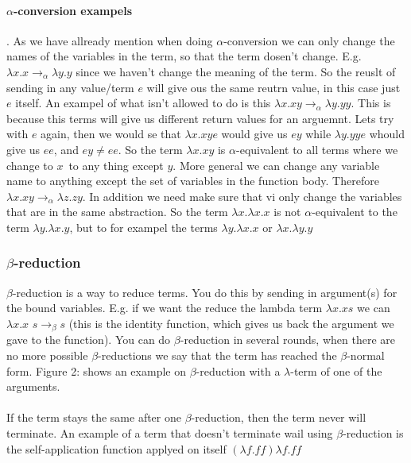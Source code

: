 \paragraph{$\alpha$-conversion exampels}. As we have allready mention when doing $\alpha$-conversion we can only change the names of the variables in the term, so that 
the term dosen't change. E.g. $\lambda x.x \rightarrow_\alpha \lambda y.y$ since we haven't change the meaning of the term. So the reuslt of sending in any value/term 
$e$ will give ous the same reutrn value, in this case just $e$ itself. An exampel of what isn't allowed to do is this $\lambda x.xy \rightarrow_\alpha \lambda y.yy$. This is 
because this terms will give us different return values for an arguemnt. Lets try with $e$ again, then we would se that  $\lambda x.xy e$ would give us $ey$ while 
$\lambda y.yy e$ whould give us $ee$, and $ey \neq ee$. So the term $\lambda x.xy$ is $\alpha$-equivalent to all terms where we change to $x$ to any thing except $y$. 
More general we can change any variable name to anything except the set of variables in the function body. Therefore $\lambda x.xy \rightarrow_\alpha \lambda z.zy$.
In addition we need make sure that vi only change the variables that are in the same abstraction. So the term $\lambda x.\lambda x.x $ is not $\alpha$-equivalent to the 
term $\lambda y.\lambda x.y$, but to for exampel the terms $\lambda y.\lambda x.x$ or $\lambda x.\lambda y.y$

\subsubsection{$\beta$-reduction}
$\beta$-reduction is a way to reduce terms. You do this by sending in argument(s) for the bound variables. E.g. if we want the reduce the lambda term $\lambda x. x s$ we can $\lambda x. x$  $s \rightarrow _\beta s$ (this is the identity function, which gives us back the argument we gave to the function). You can do $\beta$-reduction in several rounds, when there are no more possible $\beta$-reductions we say that the term has reached the $\beta$-normal form. Figure 2:  shows an example on $\beta$-reduction with a $\lambda$-term of one of the arguments. \\ \\
If the term stays the same after one $\beta$-reduction, then the term never will terminate. An example of a term that doesn't terminate wail using $\beta$-reduction is the self-application function applyed on itself $(\lambda f.ff) \lambda f.ff$

